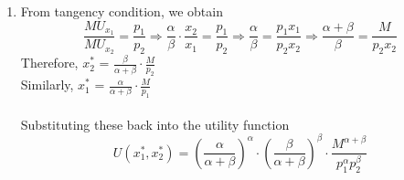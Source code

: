 \documentclass{article}
\begin{document}
\begin{enumerate}
\begin{enumerate}[label=(\roman*)]
\begin{minipage}{0.49\textwidth}
                \end{minipage}
                \hfill
                \begin{minipage}{0.49\textwidth}
                \end{minipage}
                Therefore, the optimal consumption bundle is $(16.67,0)$ which gives a utility of 16.67, clearly greater than what we obtained from the consumption bundle calculated in part (i). 
        \end{enumerate} 
    \item 
        From tangency condition, we obtain 
        \[
        \frac{MU_{x_1}}{MU_{x_2}} =\frac{p_1}{p_2} \Rightarrow \frac{\alpha}{\beta} \cdot \frac{x_2}{x_1} = \frac{p_1}{p_2} \Rightarrow \frac{\alpha}{\beta} = \frac{p_1x_1}{p_2x_2} \Rightarrow \frac{\alpha + \beta}{\beta} = \frac{M}{p_2x_2}
        \]
        Therefore, $x_2^*$ = \(\frac{\beta}{\alpha + \beta} \cdot \frac{M}{p_2}\) \\
        Similarly, $x_1^*$ = \(\frac{\alpha}{\alpha + \beta} \cdot \frac{M}{p_1}\) \\
        \\
        Substituting these back into the utility function 
        \[
        U(x_1^*,x_2^*) = {(\frac{\alpha}{\alpha + \beta})}^\alpha \cdot {(\frac{\beta}{\alpha + \beta})}^\beta \cdot \frac{M^{\alpha + \beta}}{p_1^\alpha p_2^\beta}
\]
\end{enumerate}
\end{document}
